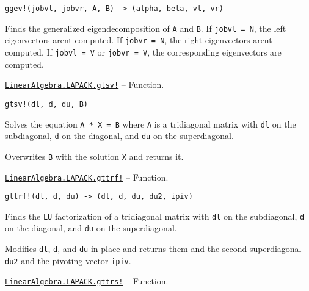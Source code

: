 \begin{adjustwidth}{2em}{0pt}


\begin{verbatim}
ggev!(jobvl, jobvr, A, B) -> (alpha, beta, vl, vr)
\end{verbatim}

Finds the generalized eigendecomposition of \texttt{A} and \texttt{B}. If \texttt{jobvl = N}, the left eigenvectors aren{\textquotesingle}t computed. If \texttt{jobvr = N}, the right eigenvectors aren{\textquotesingle}t computed. If \texttt{jobvl = V} or \texttt{jobvr = V}, the corresponding eigenvectors are computed.



\end{adjustwidth}
\hypertarget{445174240052873549}{}
\hyperlink{445174240052873549}{\texttt{LinearAlgebra.LAPACK.gtsv!}}  -- {Function.}

\begin{adjustwidth}{2em}{0pt}


\begin{verbatim}
gtsv!(dl, d, du, B)
\end{verbatim}

Solves the equation \texttt{A * X = B} where \texttt{A} is a tridiagonal matrix with \texttt{dl} on the subdiagonal, \texttt{d} on the diagonal, and \texttt{du} on the superdiagonal.

Overwrites \texttt{B} with the solution \texttt{X} and returns it.



\end{adjustwidth}
\hypertarget{9597724514453362317}{}
\hyperlink{9597724514453362317}{\texttt{LinearAlgebra.LAPACK.gttrf!}}  -- {Function.}

\begin{adjustwidth}{2em}{0pt}


\begin{verbatim}
gttrf!(dl, d, du) -> (dl, d, du, du2, ipiv)
\end{verbatim}

Finds the \texttt{LU} factorization of a tridiagonal matrix with \texttt{dl} on the subdiagonal, \texttt{d} on the diagonal, and \texttt{du} on the superdiagonal.

Modifies \texttt{dl}, \texttt{d}, and \texttt{du} in-place and returns them and the second superdiagonal \texttt{du2} and the pivoting vector \texttt{ipiv}.



\end{adjustwidth}
\hypertarget{3087963688650638106}{}
\hyperlink{3087963688650638106}{\texttt{LinearAlgebra.LAPACK.gttrs!}}  -- {Function.}

